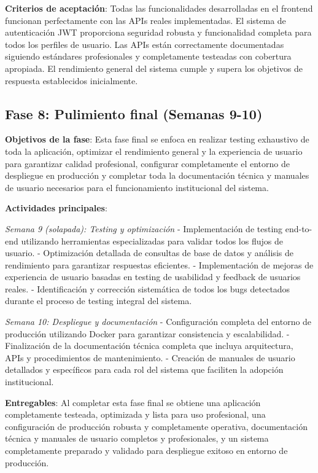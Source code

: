 \documentclass[12pt,a4paper,oneside]{report}
\begin{document}
\textbf{Criterios de aceptación}: Todas las funcionalidades desarrolladas en el frontend funcionan perfectamente con las APIs reales implementadas. El sistema de autenticación JWT proporciona seguridad robusta y funcionalidad completa para todos los perfiles de usuario. Las APIs están correctamente documentadas siguiendo estándares profesionales y completamente testeadas con cobertura apropiada. El rendimiento general del sistema cumple y supera los objetivos de respuesta establecidos inicialmente.

\subsection{Fase 8: Pulimiento final (Semanas
9-10)}\label{fase-8-pulimiento-final-semanas-9-10}

\textbf{Objetivos de la fase}: Esta fase final se enfoca en realizar testing exhaustivo de toda la aplicación, optimizar el rendimiento general y la experiencia de usuario para garantizar calidad profesional, configurar completamente el entorno de despliegue en producción y completar toda la documentación técnica y manuales de usuario necesarios para el funcionamiento institucional del sistema.

\textbf{Actividades principales}:

\emph{Semana 9 (solapada): Testing y optimización} - Implementación de testing end-to-end utilizando herramientas especializadas para validar todos los flujos de usuario. - Optimización detallada de consultas de base de datos y análisis de rendimiento para garantizar respuestas eficientes. - Implementación de mejoras de experiencia de usuario basadas en testing de usabilidad y feedback de usuarios reales. - Identificación y corrección sistemática de todos los bugs detectados durante el proceso de testing integral del sistema.

\emph{Semana 10: Despliegue y documentación} - Configuración completa del entorno de producción utilizando Docker para garantizar consistencia y escalabilidad. - Finalización de la documentación técnica completa que incluya arquitectura, APIs y procedimientos de mantenimiento. - Creación de manuales de usuario detallados y específicos para cada rol del sistema que faciliten la adopción institucional.

\textbf{Entregables}: Al completar esta fase final se obtiene una aplicación completamente testeada, optimizada y lista para uso profesional, una configuración de producción robusta y completamente operativa, documentación técnica y manuales de usuario completos y profesionales, y un sistema completamente preparado y validado para despliegue exitoso en entorno de producción.
\end{document}
